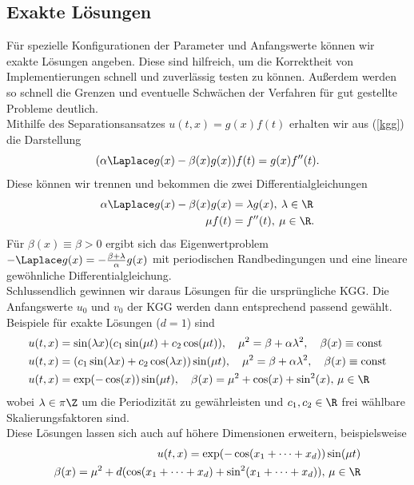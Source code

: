 \subsection{Exakte Lösungen}
Für spezielle Konfigurationen der Parameter und Anfangswerte können wir exakte Lösungen angeben. Diese sind hilfreich, um die Korrektheit von Implementierungen schnell und zuverlässig testen zu können. Außerdem werden so schnell die Grenzen und eventuelle Schwächen der Verfahren für gut gestellte Probleme deutlich.\\[0.5cm]
Mithilfe des Separationsansatzes $u(t,x)=g(x)f(t)$ erhalten wir aus (\ref{kgg}) die Darstellung
\begin{equation*}
(\alpha\Laplace g(x)-\beta(x)g(x))f(t) = g(x)f''(t).
\end{equation*}
Diese können wir trennen und bekommen die zwei Differentialgleichungen
\begin{align*}
\alpha\Laplace g(x)-\beta(x)g(x)&=\lambda g(x), \: \lambda\in\R\\
\mu f(t)&=f''(t), \: \mu\in \R.
\end{align*}
Für $\beta(x) \equiv \beta>0$ ergibt sich das Eigenwertproblem $-\Laplace g(x)=-\frac{\beta + \lambda}{\alpha}g(x)$ mit periodischen Randbedingungen und eine lineare gewöhnliche Differentialgleichung.\\
Schlussendlich gewinnen wir daraus Lösungen für die ursprüngliche KGG. Die Anfangswerte $u_0$ und $v_0$ der KGG werden dann entsprechend passend gewählt.\\[1cm]
Beispiele für exakte Lösungen ($d=1$) sind
\begin{align*}
u(t,x)&=\sin(\lambda x)(c_1 \sin(\mu t) + c_2 \cos(\mu t)), \quad \mu^2=\beta+\alpha \lambda^2,\quad \beta(x)\equiv \text{const}\\ 
u(t,x)&=(c_1 \sin(\lambda x) + c_2 \cos(\lambda x))\sin(\mu t), \quad \mu^2=\beta+\alpha \lambda^2,\quad \beta(x)\equiv \text{const}\\
u(t,x)&=\exp(-\cos(x))\sin(\mu t), \quad \beta(x)=\mu^2+\cos(x)+\sin^2(x), \, \mu \in \R
\end{align*}
wobei $\lambda\in \pi\Z$ um die Periodizität zu gewährleisten und $c_1, c_2 \in \R$ frei wählbare Skalierungsfaktoren sind.\\
Diese Lösungen lassen sich auch auf höhere Dimensionen erweitern, beispielsweise
\begin{eqnarray}
u(t,x)=\exp(-\cos(x_1+\dots+x_d))\sin(\mu t)\\
\beta(x)=\mu^2+d(\cos(x_1+\dots+x_d)+\sin^2(x_1+\dots+x_d)), \, \mu\in\R \nonumber
\end{eqnarray}

